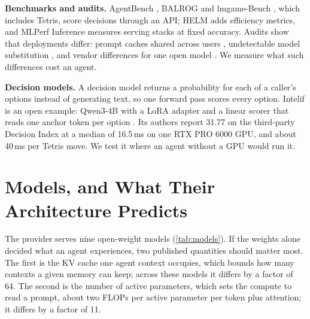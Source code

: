 \documentclass{article}
\begin{document}
\textbf{Benchmarks and audits.} AgentBench \citep{agentbench}, BALROG \citep{balrog} and lmgame-Bench \citep{lmgame}, which includes Tetris, score decisions through an API; HELM \citep{helm} adds efficiency metrics, and MLPerf Inference \citep{mlperf} measures serving stacks at fixed accuracy. Audits show that deployments differ: prompt caches shared across users \citep{gu}, undetectable model substitution \citep{cai}, and vendor differences for one open model \citep{k2}. We measure what such differences cost an agent.

\textbf{Decision models.} A decision model returns a probability for each of a caller's options instead of generating text, so one forward pass scores every option. Intelif is an open example: Qwen3-4B \citep{qwen3} with a LoRA adapter \citep{lora} and a linear scorer that reads one anchor token per option \citep{intelif}. Its authors report 31.77 on the third-party Decision Index \citep{dindex} at a median of 16.5\,ms on one RTX PRO 6000 GPU, and about 40\,ms per Tetris move. We test it where an agent without a GPU would run it.

\section{Models, and What Their Architecture Predicts}
\label{sec:models}

The provider serves nine open-weight models (\cref{tab:models}). If the weights alone decided what an agent experiences, two published quantities should matter most. The first is the KV cache one agent context occupies, which bounds how many contexts a given memory can keep; across these models it differs by a factor of 64. The second is the number of active parameters, which sets the compute to read a prompt, about two FLOPs per active parameter per token plus attention; it differs by a factor of 11.
\end{document}
